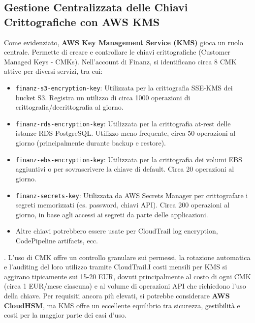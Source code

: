 \subsection{Gestione Centralizzata delle Chiavi Crittografiche con AWS KMS}
\label{subsec:kms_cap2}
Come evidenziato, \textbf{AWS Key Management Service (KMS)} gioca un ruolo centrale. Permette di creare e controllare le chiavi crittografiche (Customer Managed Keys - CMKs). Nell'account di Finanz, si identificano circa 8 CMK attive per diversi servizi, tra cui: \begin{itemize}
    \item \texttt{finanz-s3-encryption-key}: Utilizzata per la crittografia SSE-KMS dei bucket S3. Registra un utilizzo di circa 1000 operazioni di crittografia/decrittografia al giorno.
    \item \texttt{finanz-rds-encryption-key}: Utilizzata per la crittografia at-rest delle istanze RDS PostgreSQL. Utilizzo meno frequente, circa 50 operazioni al giorno (principalmente durante backup e restore).
    \item \texttt{finanz-ebs-encryption-key}: Utilizzata per la crittografia dei volumi EBS aggiuntivi o per sovrascrivere la chiave di default. Circa 20 operazioni al giorno.
    \item \texttt{finanz-secrets-key}: Utilizzata da AWS Secrets Manager per crittografare i segreti memorizzati (es. password, chiavi API). Circa 200 operazioni al giorno, in base agli accessi ai segreti da parte delle applicazioni.
    \item Altre chiavi potrebbero essere usate per CloudTrail log encryption, CodePipeline artifacts, ecc.
\end{itemize}. 
L'uso di CMK offre un controllo granulare sui permessi, la rotazione automatica e l'auditing del loro utilizzo tramite CloudTrail.I costi mensili per KMS si aggirano tipicamente sui 15-20 EUR, dovuti principalmente al costo di ogni CMK (circa 1 EUR/mese ciascuna) e al volume di operazioni API che richiedono l'uso della chiave. Per requisiti ancora più elevati, si potrebbe considerare \textbf{AWS CloudHSM}, ma KMS offre un eccellente equilibrio tra sicurezza, gestibilità e costi per la maggior parte dei casi d'uso.

